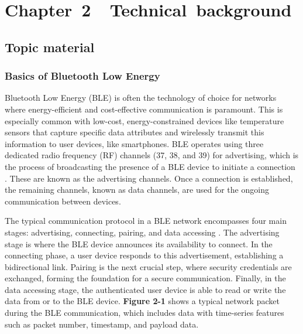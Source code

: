 \section*{Chapter~2~~Technical~background}
\setcounter{section}{2} \setcounter{subsection}{0} 
\setcounter{table}{0} \setcounter{figure}{0} \setcounter{equation}{0} \setcounter{definition}{0}

\subsection{Topic material}

\subsubsection{Basics of Bluetooth Low Energy}
\noindent Bluetooth Low Energy (BLE) is often the technology of choice for networks where energy-efficient and cost-effective communication is paramount. This is especially common with low-cost, energy-constrained devices like temperature sensors that capture specific data attributes and wirelessly transmit this information to user devices, like smartphones. BLE operates using three dedicated radio frequency (RF) channels (37, 38, and 39) for advertising, which is the process of broadcasting the presence of a BLE device to initiate a connection \cite{gomez2012overview}. These are known as the advertising channels. Once a connection is established, the remaining channels, known as data channels, are used for the ongoing communication between devices.

\vspace{4pt}

The typical communication protocol in a BLE network encompasses four main stages: advertising, connecting, pairing, and data accessing \cite{wu2020blueshield}. The advertising stage is where the BLE device announces its availability to connect. In the connecting phase, a user device responds to this advertisement, establishing a bidirectional link. Pairing is the next crucial step, where security credentials are exchanged, forming the foundation for a secure communication. Finally, in the data accessing stage, the authenticated user device is able to read or write the data from or to the BLE device. \textbf{Figure 2-1} shows a typical network packet during the BLE communication, which includes data with time-series features such as packet number, timestamp, and payload data.


